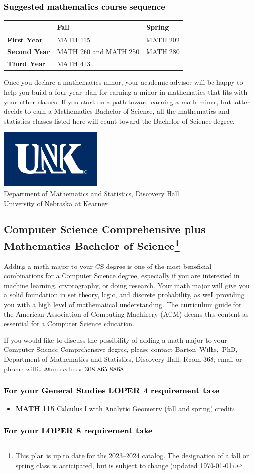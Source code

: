 \documentclass[10pt]{article}
\makeatletter
\newcommand{\calcone}{\textbf{MATH 115} Calculus I with Analytic Geometry (fall and spring) \dotfill 5 credits}
\newcommand{\calconeshort}{MATH 115}
\newcommand{\calctwoshort}{MATH 202}
\newcommand{\foundationsshort}{MATH 250}
\newcommand{\calcthreeshort}{MATH 260}
\newcommand{\linearshort}{MATH 280}
\newcommand{\discreteshort}{MATH 413}
\newcommand{\contactbw}{\mbox{Barton Willis, PhD}, Department of Mathematics and Statistics,  Discovery Hall, Room 368;
email or phone: \href{mailto:willisb@unk.edu}{willisb@unk.edu} or 308-865-8868.}
\newcommand{\forinfo}[2]{If you would like to discuss the possibility of adding a math {#1} to your {#2}, please contact \contactbw}
\newcommand{\catalog}{2023--2024 }
\newcommand{\LOPER}{LOPER\xspace}
\newcommand{\myfootnote}{\footnote{This plan is up to date for  the \catalog catalog. The designation of a fall or spring class is 
anticipated, but  is subject to change (updated \today).}}
\newcommand{\myheading}{
\begin{flushleft}
\includegraphics[scale=0.35]{unk-logo}\\
\setcounter{footnote}{0}
\vspace{0.25in}
 \textcolor{unkblue}{Department of Mathematics and Statistics, Discovery Hall} \\
  \textcolor{unkblue}{University of Nebraska at Kearney}
\end{flushleft}}
\newcommand{\mathminor}{
   \begin{tabular}[h]{| l | l | l|} 
      \hline
                 & \textbf{Fall}         &  \textbf{Spring}  \\ \hline 
      \textbf{First Year} & \calconeshort & \calctwoshort \\  \hline
      \textbf{Second Year} &  \calcthreeshort{} and \foundationsshort{} &  \linearshort \\ \hline
      \textbf{Third Year} &    \discreteshort              &  \\ \hline
      \end{tabular}}
\makeatother
\begin{document}
\subsubsection*{\textcolor{black}{Suggested mathematics course sequence}}

\mathminor



 \vspace{0.1in}
\noindent Once you declare a mathematics minor, your academic advisor will be happy to help you build a 
four-year plan for earning a minor in mathematics that fits with 
your other classes.  If you start on a path toward earning a math minor, but latter decide to 
earn a  Mathematics Bachelor of 
Science, all the mathematics and statistics  classes listed here 
will count toward the Bachelor of Science degree.


\newpage

\myheading



\vspace{-0.1in}
\subsection*{\textbf{\textcolor{unkblue}{Computer Science Comprehensive plus Mathematics Bachelor of Science\myfootnote}}}

Adding a math major to your CS degree is one of the most beneficial combinations for a Computer Science degree, especially if you are interested in machine learning, cryptography,   or doing research.  Your math major  will give you a solid foundation in set theory, logic, and discrete probability, as well providing you with a high level of mathematical understanding.  The curriculum guide for the American Association of Computing Machinery (ACM) deems  this content  as essential for  a Computer Science education.



\forinfo{major}{Computer Science Comprehensive degree}


\subsubsection*{\textcolor{black}{For your General Studies \LOPER 4 requirement take}}
\begin{itemize}
\item \calcone
\end{itemize}

\subsubsection*{\textcolor{black}{For your \LOPER 8 requirement take}}
\end{document}
